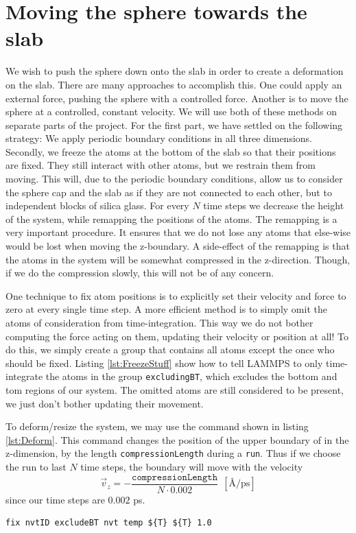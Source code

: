 \documentclass[twoside,english]{uiofysmaster}
\begin{document}
\section{Moving the sphere towards the slab} \label{sec:movingSphereDown}
We wish to push the sphere down onto the slab in order to create a deformation on the slab. There are many approaches to accomplish this. 
One could apply an external force, pushing the sphere with a controlled force. 
Another is to move the sphere at a controlled, constant velocity.  
We will use both of these methods on separate parts of the project.
For the first part, we have settled on the following strategy:
We apply periodic boundary conditions in all three dimensions. 
Secondly, we freeze the atoms at the bottom of the slab so that their positions are fixed. 
They still interact with other atoms, but we restrain them from moving. 
This will, due to the periodic boundary conditions, allow us to consider the sphere cap and the slab as if they are not connected to each other, but to independent blocks of silica glass.  
For every $N$ time steps we decrease the height of the system, while remapping the positions of the atoms. 
The remapping is a very important procedure. 
It ensures that we do not lose any atoms that else-wise would be lost when moving the z-boundary. 
A side-effect of the remapping is that the atoms in the system will be somewhat compressed in the z-direction. 
Though, if we do the compression slowly, this will not be of any concern. 

One technique to fix atom positions is to explicitly set their velocity and force to zero at every single time step.
A more efficient method is to simply omit the atoms of consideration from time-integration. 
This way we do not bother computing the force acting on them, updating their velocity or position at all! 
To do this, we simply create a group that contains all atoms except the once who should be fixed.
Listing \ref{lst:FreezeStuff} show how to tell LAMMPS to only time-integrate the atoms in the group \texttt{excludingBT}, which excludes the bottom and tom regions of our system.
The omitted atoms are still considered to be present, we just don't bother updating their movement.

To deform/resize the system, we may use the command shown in listing \ref{lst:Deform}. 
This command changes the position of the upper boundary of in the z-dimension, by the length \texttt{compressionLength} during a \texttt{run}.
Thus if we choose the run to last $N$ time steps, the boundary will move with the velocity 
\begin{equation}
	\vec{v}_z = -\frac{\texttt{compressionLength}}{N\cdot0.002} ~~ [\text{\AA/ps}]
\end{equation}
since our time steps are $0.002$ ps.
\begin{lstlisting}[caption={Time-integrating only atoms in a specified group, \texttt{excludeBT}, effectively fixing all others.}, label={lst:FreezeStuff}, language=LammpsInput]
fix nvtID excludeBT nvt temp ${T} ${T} 1.0
\end{lstlisting}
\end{document}
